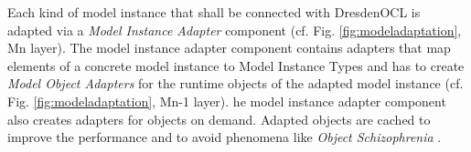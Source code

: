 	Each kind of model instance that shall be connected with DresdenOCL is
	adapted via a \emph{Model Instance Adapter} component (cf. Fig.
	\ref{fig:modeladaptation}, Mn layer). The model instance adapter component contains adapters that map elements of a
	concrete model instance to Model Instance Types and has to
	create \emph{Model Object Adapters} for the runtime 
	objects of the adapted model instance (cf. Fig. \ref{fig:modeladaptation}, Mn-1 layer). 
	he model instance adapter component also 
	creates adapters for objects on demand. Adapted objects are cached to
	improve the performance and to avoid phenomena like \emph{Object
	Schizophrenia} \cite{assmann:isc}.
	



